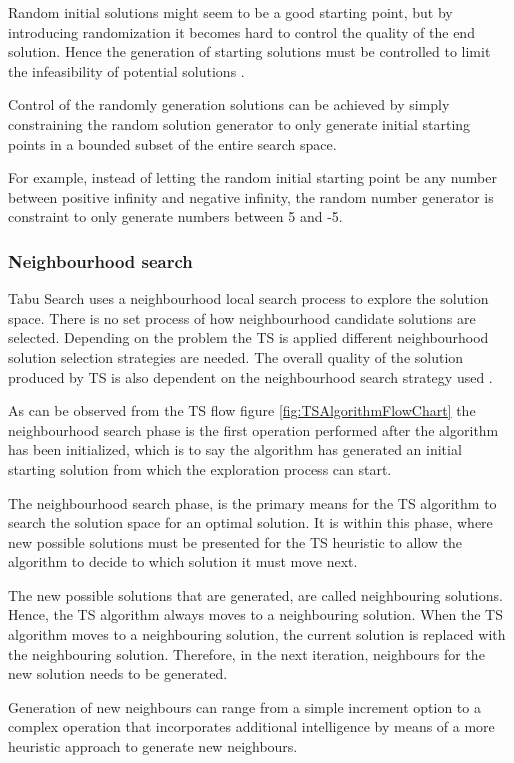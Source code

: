 Random initial solutions might seem to be a good starting point, but by introducing randomization it becomes hard to control the quality of the end solution\cite{TSHazardous}. Hence the generation of starting solutions must be controlled to limit the infeasibility of potential solutions \cite{TSHazardous}. 

Control of the randomly generation solutions can be achieved by simply constraining the random solution generator to only generate initial starting points in a bounded subset of the entire search space. 

For example, instead of letting the random initial starting point be any number between positive infinity and negative infinity, the random number generator is constraint to only generate numbers between 5 and -5.

\subsubsection{Neighbourhood search}
Tabu Search uses a neighbourhood local search process to explore the solution space. There is no set process of how neighbourhood candidate solutions are selected. Depending on the problem the TS is applied different neighbourhood solution selection strategies are needed. The overall quality of the solution produced by TS is also dependent on the neighbourhood search strategy used \cite{TSHazardous}. 

As can be observed from the TS flow figure \ref{fig:TSAlgorithmFlowChart} the neighbourhood search phase is the first operation performed after the algorithm has been initialized, which is to say the algorithm has generated an initial starting solution from which the exploration process can start.

The neighbourhood search phase, is the primary means for the TS algorithm to search the solution space for an optimal solution. It is within this phase, where new possible solutions must be presented for the TS heuristic to allow the algorithm to decide to which solution it must move next.

The new possible solutions that are generated, are called neighbouring solutions. Hence, the TS algorithm always moves to a neighbouring solution. When the TS algorithm moves to a neighbouring solution, the current solution is replaced with the neighbouring solution. Therefore, in the next iteration, neighbours for the new solution needs to be generated.

Generation of new neighbours can range from a simple increment option to a complex operation that incorporates additional intelligence by means of a more heuristic approach to generate new neighbours.


